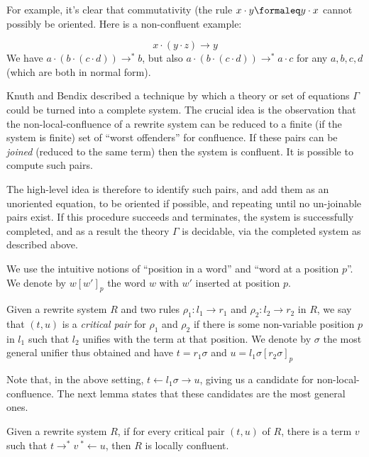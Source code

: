 For example, it's clear that commutativity (the rule $x\cdot y\formaleq y\cdot x$ cannot possibly be oriented. Here is a non-confluent example:

\[ x \cdot (y \cdot z) \rightarrow y \]
We have $a\cdot (b \cdot (c \cdot d)) \rightarrow^* b$, but also $a\cdot (b\cdot (c\cdot d))\rightarrow^* a\cdot c$ for any $a, b, c, d$ (which are both in normal form).

Knuth and Bendix \cite{knuth-bendix} described a technique by which a theory or set of equations $\Gamma$ could be turned into a complete system. The crucial idea is the observation that the non-local-confluence of a rewrite system can be reduced to a finite (if the system is finite) set of ``worst offenders'' for confluence. If these pairs can be \emph{joined} (reduced to the same term) then the system is confluent. It is possible to compute such pairs.

The high-level idea is therefore to identify such pairs, and add them as an unoriented equation, to be oriented if possible, and repeating until no un-joinable pairs exist. If this procedure succeeds and terminates, the system is successfully completed, and as a result the theory $\Gamma$ is decidable, via the completed system as described above.

We use the intuitive notions of ``position in a word'' and ``word at a position $p$''. We denote by $w[w']_p$ the word $w$ with $w'$ inserted at position $p$.

\begin{definition}
  Given a rewrite system $R$ and two rules $\rho_1: l_1\rightarrow r_1$ and $\rho_2: l_2\rightarrow r_2$ in $R$, we say that $(t, u)$ is a \emph{critical pair} for $\rho_1$ and $\rho_2$ if there is some non-variable position $p$ in $l_1$ such that $l_2$ unifies with the term at that position. We denote by $\sigma$ the most general unifier thus obtained and have $t = r_1\sigma$ and $u = l_1\sigma[r_2\sigma]_p$
\end{definition}

Note that, in the above setting, $t\leftarrow l_1\sigma\rightarrow u$, giving us a candidate for non-local-confluence. The next lemma states that these candidates are the most general ones.

\begin{theorem}
  Given a rewrite system $R$, if for every critical pair $(t, u)$ of $R$, there is a term $v$ such that $t\rightarrow^* v\ {}^*\leftarrow u$, then $R$ is locally confluent.
\end{theorem}

